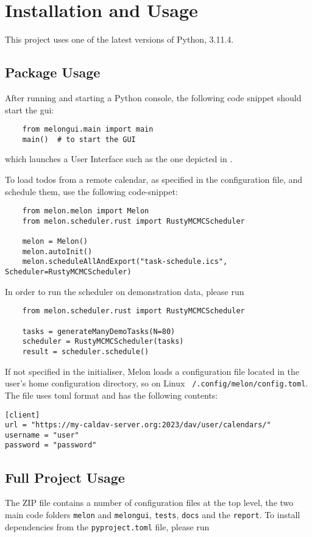 \section{Installation and Usage}
This project uses one of the latest versions of Python, 3.11.4.

\subsection{Package Usage}
After running  and starting a Python console, the following code snippet should start the \gls{gui}:

\begin{verbatim}
    from melongui.main import main
    main()  # to start the GUI
  \end{verbatim}

which launches a User Interface such as the one depicted in .

To load todos from a remote calendar, as specified in the configuration file, and schedule them, use the following code-snippet:
\begin{verbatim}
    from melon.melon import Melon
    from melon.scheduler.rust import RustyMCMCScheduler

    melon = Melon()
    melon.autoInit()
    melon.scheduleAllAndExport("task-schedule.ics", Scheduler=RustyMCMCScheduler)
  \end{verbatim}

In order to run the scheduler on demonstration data, please run
\begin{verbatim}
    from melon.scheduler.rust import RustyMCMCScheduler

    tasks = generateManyDemoTasks(N=80)
    scheduler = RustyMCMCScheduler(tasks)
    result = scheduler.schedule()
  \end{verbatim}

If not specified in the initialiser, Melon loads a configuration file located in the user's home configuration directory, so on Linux \texttt{~/.config/melon/config.toml}.
The file uses \gls{toml} format and has the following contents:
\begin{verbatim}
[client]
url = "https://my-caldav-server.org:2023/dav/user/calendars/"
username = "user"
password = "password"
  \end{verbatim}

\subsection{Full Project Usage}
The ZIP file contains a number of configuration files at the top level, the two main code folders \texttt{melon} and \texttt{melongui}, \texttt{tests}, \texttt{docs} and the \texttt{report}.
To install dependencies from the \texttt{pyproject.toml} file, please run

